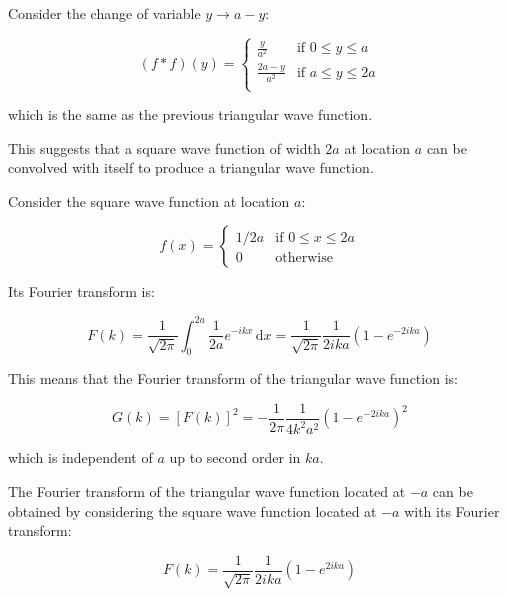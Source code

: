 \documentclass[12pt]{article}
\begin{document}
Consider the change of variable $y \to a - y$:

\begin{equation}
    (f * f)(y) =
    \begin{cases}
        \frac{y}{a^{2}}      & \text{if } 0 \leq y \leq a  \\
        \frac{2a - y}{a^{2}} & \text{if } a \leq y \leq 2a \\
    \end{cases}
\end{equation}

which is the same as the previous triangular wave function.

This suggests that a square wave function of width $2a$ at location $a$ can be convolved with itself to produce a triangular wave function.

Consider the square wave function at location $a$:

\begin{equation}
    f(x) =
    \begin{cases}
        1/2a & \text{if } 0 \leq x \leq 2a \\
        0    & \text{otherwise}
    \end{cases}
\end{equation}

Its Fourier transform is:

\begin{equation}
    F(k) = \frac{1}{\sqrt{2\pi}} \int_{0}^{2a} \frac{1}{2a} e^{-ikx} \, \mathrm{d}x = \frac{1}{\sqrt{2\pi}} \frac{1}{2ika} \left( 1 - e^{-2ika} \right)
\end{equation}

This means that the Fourier transform of the triangular wave function is:

\begin{equation}
    G(k) = \left[ F(k) \right]^{2} = -\frac{1}{2\pi} \frac{1}{4k^{2}a^{2}} \left( 1 - e^{-2ika} \right)^{2}
\end{equation}

which is independent of $a$ up to second order in $ka$.

The Fourier transform of the triangular wave function located at $-a$ can be obtained by considering the square wave function located at $-a$ with its Fourier transform:

\begin{equation}
    F(k) = \frac{1}{\sqrt{2\pi}} \frac{1}{2ika} \left( 1 - e^{2ika} \right)
\end{equation}
\end{document}
